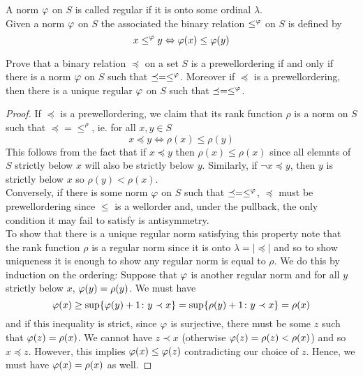 \noindent
A norm $\varphi$ on $S$ is called regular if it is onto some ordinal $\lambda$. \\ 
Given a norm $\varphi$ on $S$ the associated the binary relation $\le^{\varphi}$ on $S$ is defined by 
\[ x \le^{\varphi} y \Leftrightarrow \varphi(x) \le \varphi(y) \]

\begin{exercise}
    Prove that a binary relation $\preceq$ on a set $S$ is a prewellordering if and only if there is a norm $\varphi$ on $S$ such that $\preceq = \le^{\varphi}$. Moreover if $\preceq$ is a prewellordering, then there is a unique regular $\varphi$ on $S$ such that $\preceq = \le^{\varphi}$.
\end{exercise}

\begin{proof}
    If $\preceq$ is a prewellordering, we claim that its rank function $\rho$ is a norm on $S$ such that $\preceq = \le^{\rho}$, ie. for all $x,y \in S$ 
    \[ x \preceq y \Leftrightarrow \rho(x) \le \rho(y) \]
    This follows from the fact that if $x \preceq y$ then $\rho(x) \le \rho(x)$ since all elemnts of $S$ strictly below $x$ will also be strictly below $y$. Similarly, if $\neg x \preceq y$, then $y$ is strictly below $x$ so $\rho(y) < \rho(x)$.  \\
    Conversely, if there is some norm $\varphi$ on $S$ such that $\preceq = \le^{\varphi}$, $\preceq$ must be prewellordering since $\le$ is a wellorder and, under the pullback, the only condition it may fail to satisfy is antisymmetry. \\ 
    To show that there is a unique regular norm satisfying this property note that the rank function $\rho$ is a regular norm since it is onto $\lambda = |\preceq|$ and so to show uniqueness it is enough to show any regular norm is equal to $\rho$. We do this by induction on the ordering: Suppose that $\varphi$ is another regular norm and for all $y$ strictly below $x$, $\varphi(y) = \rho(y)$. We must have 
    \[ \varphi(x) \ge \sup\{ \varphi(y)+1 \colon y \prec x\} = \sup\{ \rho(y) + 1 \colon y \prec x\} = \rho(x) \]
    and if this inequality is strict, since $\varphi$ is surjective, there must be some $z$ such that $\varphi(z) = \rho(x)$. We cannot have $z \prec x$ (otherwise $\varphi(z) = \rho(z) < \rho(x)$) and so $x \preceq z$. However, this implies $\varphi(x) \le \varphi(z)$ contradicting our choice of $z$. Hence, we must have $\varphi(x) = \rho(x)$ as well. 
\end{proof}